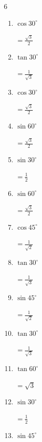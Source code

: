 \begin{multicols}{6}
\begin{enumerate}
        $\displaystyle =\frac{1}{2}$

  \item $\displaystyle \cos{30^\circ}$

        $\displaystyle =\frac{\sqrt{3}}{2}$

  \item $\displaystyle \tan{30^\circ}$

        $\displaystyle =\frac{1}{\sqrt{3}}$

  \item $\displaystyle \cos{30^\circ}$

        $\displaystyle =\frac{\sqrt{3}}{2}$

  \item $\displaystyle \sin{60^\circ}$

        $\displaystyle =\frac{\sqrt{3}}{2}$

  \item $\displaystyle \sin{30^\circ}$

        $\displaystyle =\frac{1}{2}$

  \item $\displaystyle \sin{60^\circ}$

        $\displaystyle =\frac{\sqrt{3}}{2}$

  \item $\displaystyle \cos{45^\circ}$

        $\displaystyle =\frac{1}{\sqrt{2}}$

  \item $\displaystyle \tan{30^\circ}$

        $\displaystyle =\frac{1}{\sqrt{3}}$

  \item $\displaystyle \sin{45^\circ}$

        $\displaystyle =\frac{1}{\sqrt{2}}$

  \item $\displaystyle \tan{30^\circ}$

        $\displaystyle =\frac{1}{\sqrt{3}}$

  \item $\displaystyle \tan{60^\circ}$

        $\displaystyle =\sqrt{3}$

  \item $\displaystyle \sin{30^\circ}$

        $\displaystyle =\frac{1}{2}$

  \item $\displaystyle \sin{45^\circ}$


\end{enumerate}
\end{multicols}
